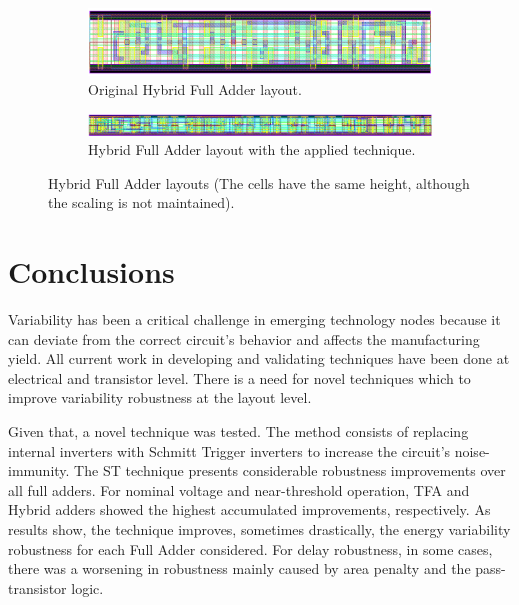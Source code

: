 \documentclass[ecp,tc, english]{iiufrgs}
\begin{document}
\begin{figure}[H]
  \centering
  \begin{subfigure}{\linewidth}
    \centering
    \includegraphics[width=\linewidth]{HYBRID.png}
    \caption{Original Hybrid Full Adder layout.}
  \end{subfigure}

  \begin{subfigure}{\linewidth}
    \centering
    \includegraphics[width=\linewidth]{HYBRIDST.png}
    \caption{Hybrid Full Adder layout with the applied technique.}
  \end{subfigure}  
  \caption{Hybrid Full Adder layouts (The cells have the same height, although the scaling is not maintained).}
  \label{HYBRID}
\end{figure}

\chapter{Conclusions}

Variability has been a critical challenge in emerging technology nodes because it can deviate from the correct circuit's behavior and affects the manufacturing yield. All current work in developing and validating techniques have been done at electrical and transistor level. There is a need for novel techniques which to improve variability robustness at the layout level.

Given that, a novel technique was tested. The method consists of replacing internal inverters with Schmitt Trigger inverters to increase the circuit’s noise-immunity. The ST technique presents considerable robustness improvements over all full adders. For nominal voltage and near-threshold operation, TFA and Hybrid adders showed the highest accumulated improvements, respectively. As results show, the technique improves, sometimes drastically, the energy variability robustness for each Full Adder considered. For delay robustness, in some cases, there was a worsening in robustness mainly caused by area penalty and the pass-transistor logic. 
\end{document}
